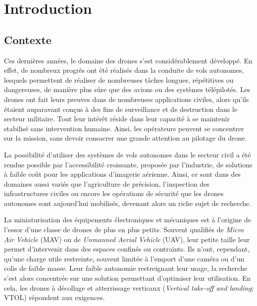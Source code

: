 \chapter*{Introduction}


\section*{Contexte}
Ces dernières années, le domaine des drones s'est considérablement développé. En effet, de nombreux progrès ont été réalisés dans la conduite de vols autonomes, lesquels permettent de réaliser de nombreuses tâches longues, répétitives ou dangereuses, de manière plus sûre que des avions ou des systèmes télépilotés. Les drones ont fait leurs preuves dans de nombreuses applications civiles, alors qu'ils étaient auparavant conçus à des fins de surveillance et de destruction dans le secteur militaire. Tout leur intérêt réside dans leur capacité à se maintenir stabilisé sans intervention humaine. Ainsi, les opérateurs peuvent se concentrer sur la mission, sans devoir consacrer une grande attention au pilotage du drone. 

La possibilité d'utiliser des systèmes de vols autonomes dans le secteur civil a été rendue possible par l'accessibilité croissante, proposée par l'industrie, de solutions à faible coût pour les applications d'imagerie aérienne. Ainsi, ce sont dans des domaines aussi variés que l'agriculture de précision,  l'inspection des infrastructures civiles ou encore les opérations de sécurité que les drones autonomes sont aujourd'hui mobilisés, devenant alors un riche sujet de recherche.

La miniaturisation des équipements électroniques et mécaniques est à l'origine de l'essor d'une classe de drones de plus en plus petits. Souvent qualifiés de \textit{Micro Air Vehicle} (MAV) ou de \textit{Unmanned Aerial Vehicle} (UAV), leur petite taille leur permet d'intervenir dans des espaces confinés ou contraints. Ils n'ont, cependant, qu'une charge utile restreinte, souvent limitée à l'emport d'une caméra ou d'un colis de faible masse. Leur faible autonomie restreignant leur usage, la recherche s'est alors concentrée sur une solution permettant d'optimiser leur utilisation. En cela, les drones à décollage et atterrissage verticaux (\textit{Vertical take-off and landing}; VTOL) répondent aux exigences.

